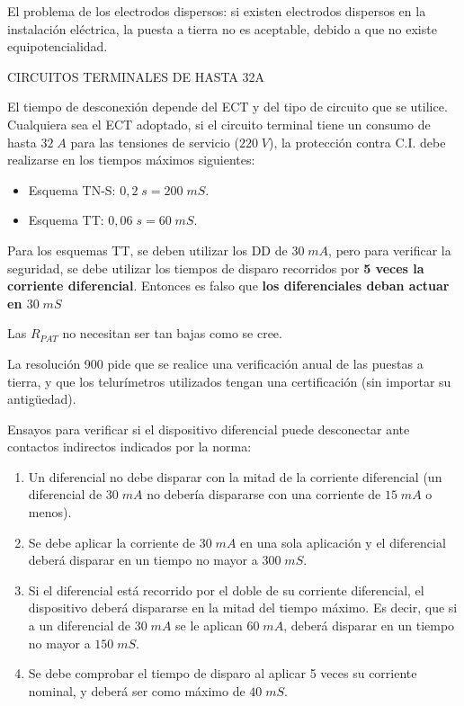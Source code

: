 El problema de los electrodos dispersos: si existen electrodos dispersos en la instalación eléctrica, la puesta a tierra no es aceptable, debido a que no existe equipotencialidad.

CIRCUITOS TERMINALES DE HASTA 32A

El tiempo de desconexión depende del ECT y del tipo de circuito que se utilice.
Cualquiera sea el ECT adoptado, si el circuito terminal tiene un consumo de hasta $32\; A$ para las tensiones de servicio ($220\; V$), la protección contra C.I. debe realizarse en los tiempos máximos siguientes:

\begin{itemize}
	\item Esquema TN-S: $0,2\; s=200\; mS$.
	\item Esquema TT: $0,06\; s=60\; mS$.
\end{itemize} 

Para los esquemas TT, se deben utilizar los DD de $30\; mA$, pero para verificar la seguridad, se debe utilizar los tiempos de disparo recorridos por \textbf{5 veces la corriente diferencial}. Entonces es falso que \textbf{los diferenciales deban actuar en $30\; mS$}

Las $R_{PAT}$ no necesitan ser tan bajas como se cree.

La resolución 900 pide que se realice una verificación anual de las puestas a tierra, y que los telurímetros utilizados tengan una certificación (sin importar su antigüedad).

Ensayos para verificar si el dispositivo diferencial puede desconectar ante contactos indirectos indicados por la norma:
\begin{enumerate}
	\item Un diferencial no debe disparar con la mitad de la corriente diferencial (un diferencial de $30\; mA$ no debería dispararse con una corriente de $15\; mA$ o menos).
	\item Se debe aplicar la corriente de $30\; mA$ en una sola aplicación y el diferencial deberá disparar en un tiempo no mayor a $300\; mS$.
	\item Si el diferencial está recorrido por el doble de su corriente diferencial, el dispositivo deberá dispararse en la mitad del tiempo máximo. Es decir, que si a un diferencial de $30\; mA$ se le aplican $60\; mA$, deberá disparar en un tiempo no mayor a $150\; mS$.
	\item Se debe comprobar el tiempo de disparo al aplicar 5 veces su corriente nominal, y deberá ser como máximo de $40\; mS$.
\end{enumerate}


